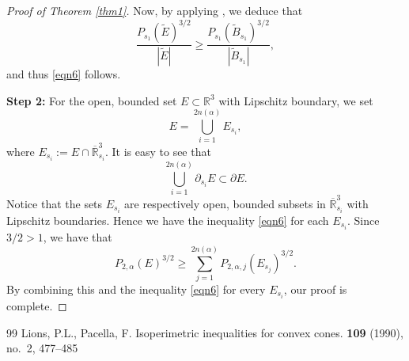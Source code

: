 \documentclass[10pt,a4paper]{amsart}
\begin{document}
\begin{proof}[Proof of Theorem \ref{thm1}]
		Now, by applying \cite[Theorem 1.1]{Lions}, we deduce that
		$$ \dfrac{P_{s_1}(\widetilde{E})^{3/2}}{|\widetilde{E}|} \geq \dfrac{P_{s_1}(\widetilde{B}_{s_1})^{3/2}}{|\widetilde{B}_{s_1}|}, $$
		and thus \eqref{eqn6} follows. 
		
		\noindent \textbf{Step 2:} For the open, bounded set $E \subset \mathbb{R}^3$ with Lipschitz boundary, we set
		$$E = \bigcup_{i=1}^{2n(\alpha)} E_{s_i}, $$
		where $E_{s_i} := E \cap \overline{\mathbb{R}}^3_{s_i}$. It is easy to see that
		\begin{equation}\label{eqn7}
			\bigcup_{i=1}^{2n(\alpha)} \partial_{s_i} E \subset \partial E.
		\end{equation}
		Notice that the sets $E_{s_i}$ are respectively open, bounded subsets in $\overline{\mathbb{R}}^3_{s_i}$ with Lipschitz boundaries. Hence we have the inequality \eqref{eqn6} for each $E_{s_i}$. Since $3/2 > 1$, we have that
		$$ P_{2,\alpha} (E)^{3/2} \geq \sum\limits_{j=1}^{2n(\alpha)} P_{2,\alpha,j}( E_{s_j})^{3/2}.$$
		By combining this and the inequality \eqref{eqn6} for every $E_{s_i}$, our proof is complete. 
	\end{proof}

\begin{thebibliography}{99}
 {\sc Lions, P.L., Pacella, F.} \newblock Isoperimetric inequalities for convex cones.  {\bf 109} (1990), no.~2, 477--485
\end{thebibliography}
\end{document}
